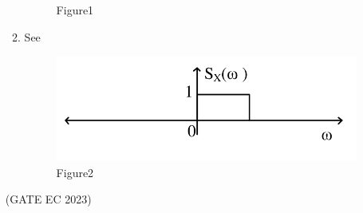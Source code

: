 \begin{enumerate}[label=\thechapter.\arabic*,ref=\thechapter.\theenumi]
\begin{enumerate}
\begin{figure}[ht]
    \caption{Figure1}
	\label{Fig:30,2022,Figure1}
\end{figure}
\item See 
\begin{figure}[ht!]
	\centering
	\includegraphics[width=\columnwidth]{gate/EC/2022/30/figs/fig2.png}
    \caption{Figure2}
	\label{Fig:30,2022,Figure2}
\end{figure}
\end{enumerate}
\hfill(GATE EC 2023)\\

\end{enumerate}
